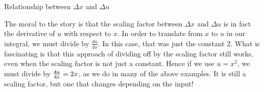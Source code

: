 \begin{exercise}{Relationship between $\Delta x$ and $\Delta u$ \Coffeecup }
\begin{itemize}
\end{itemize}
\end{exercise}

 The moral to the story is that the scaling factor between $\Delta x$ and $\Delta u$ is in fact the derivative of $u$ with respect to $x$.   In order to translate from $x$ to $u$ in our integral, we must divide by $\frac{du}{dx}$. In this case, that was just the constant 2. 
What is fascinating is that this approach of dividing off by the scaling factor still works, even when the scaling factor is not just a constant.  Hence if we use $u=x^2$, we must divide by $\frac{\mathop{}\!\mathtt{d} u }{\mathop{}\!\mathtt{d} x}=2x$, as we do in many of the above examples.  It is still a scaling factor, but one that changes depending on the input!  

